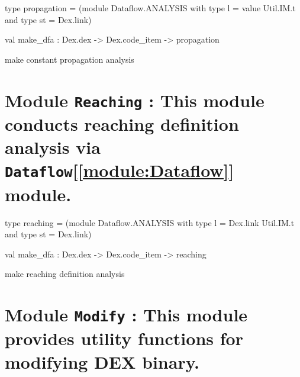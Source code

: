 \documentclass[11pt]{article}
\begin{document}
\label{type:Propagation.propagation}\begin{ocamldoccode}
type propagation = (module Dataflow.ANALYSIS with type l = value Util.IM.t and type st = 
   Dex.link) 
\end{ocamldoccode}




\label{val:Propagation.make-underscoredfa}\begin{ocamldoccode}
val make_dfa : Dex.dex -> Dex.code_item -> propagation
\end{ocamldoccode}
\begin{ocamldocdescription}
make constant propagation analysis


\end{ocamldocdescription}


\section{Module {\tt{Reaching}} : This module conducts reaching definition analysis via {\tt{Dataflow}}[\ref{module:Dataflow}] module.}
\label{module:Reaching}




\ocamldocvspace{0.5cm}



\label{type:Reaching.reaching}\begin{ocamldoccode}
type reaching = (module Dataflow.ANALYSIS with type l = Dex.link Util.IM.t and type st = 
   Dex.link) 
\end{ocamldoccode}




\label{val:Reaching.make-underscoredfa}\begin{ocamldoccode}
val make_dfa : Dex.dex -> Dex.code_item -> reaching
\end{ocamldoccode}
\begin{ocamldocdescription}
make reaching definition analysis


\end{ocamldocdescription}


\section{Module {\tt{Modify}} : This module provides utility functions for modifying DEX binary.}
\label{module:Modify}
\end{document}
